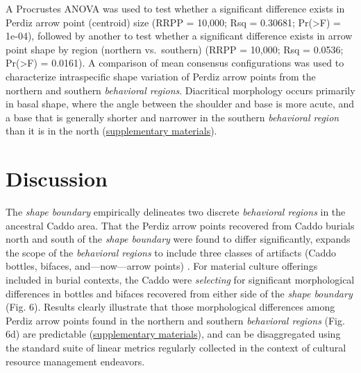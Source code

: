 \documentclass[smallextended]{svjour3}       %
\begin{document}
A Procrustes ANOVA was used to test whether a significant difference
exists in Perdiz arrow point (centroid) size (RRPP = 10,000; Rsq =
0.30681; Pr(\textgreater F) = 1e-04), followed by another to test
whether a significant difference exists in arrow point shape by region
(northern vs.~southern) (RRPP = 10,000; Rsq = 0.0536; Pr(\textgreater F)
= 0.0161). A comparison of mean consensus configurations was used to
characterize intraspecific shape variation of Perdiz arrow points from
the northern and southern \emph{behavioral regions}. Diacritical
morphology occurs primarily in basal shape, where the angle between the
shoulder and base is more acute, and a base that is generally shorter
and narrower in the southern \emph{behavioral region} than it is in the
north (\href{https://seldenlab.github.io/perdiz3/}{supplementary
materials}).

\hypertarget{discussion}{%
\section{Discussion}\label{discussion}}

The \emph{shape boundary} empirically delineates two discrete
\emph{behavioral regions} in the ancestral Caddo area. That the Perdiz
arrow points recovered from Caddo burials north and south of the
\emph{shape boundary} were found to differ significantly, expands the
scope of the \emph{behavioral regions} to include three classes of
artifacts (Caddo bottles, bifaces, and---now---arrow points)
\cite{RN8074,RN7927,RN8370,RN8312,RN8322,RN8158}. For material culture
offerings included in burial contexts, the Caddo were \emph{selecting}
for significant morphological differences in bottles and bifaces
recovered from either side of the \emph{shape boundary} (Fig. 6).
Results clearly illustrate that those morphological differences among
Perdiz arrow points found in the northern and southern \emph{behavioral
regions} (Fig. 6d) are predictable
(\href{https://seldenlab.github.io/perdiz3/}{supplementary materials}),
and can be disaggregated using the standard suite of linear metrics
regularly collected in the context of cultural resource management
endeavors.
\end{document}
